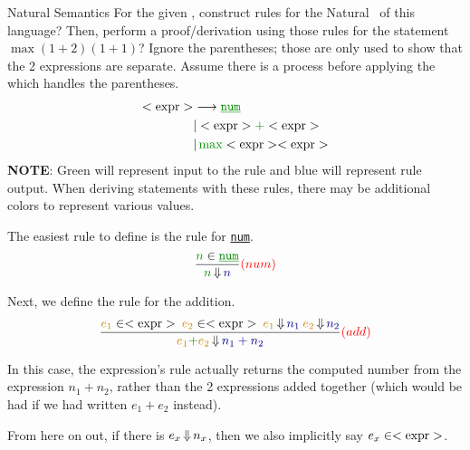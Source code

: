 \begin{example}[Lecture 3]{Natural Semantics}
  For the given , construct rules for the Natural~ of this language?
  Then, perform a proof/derivation using those rules for the statement $\max (1+2) (1+1)$?
  Ignore the parentheses; those are only used to show that the 2 expressions are separate.
  Assume there is a process before applying the  which handles the parentheses.
  \begin{align*}
    \Nonterminal{expr} &\longrightarrow \textcolor{Green4}{\underline{\mathtt{num}}} \\
                       &\vert \Nonterminal{expr} \textcolor{Green4}{+} \Nonterminal{expr} \\
                       &\vert \, \textcolor{Green4}{\mathtt{\max}} \Nonterminal{expr} \Nonterminal{expr}
  \end{align*}
  \tcblower{}
  \textbf{NOTE}: Green will represent input to the rule and blue will represent rule output.
  When deriving statements with these rules, there may be additional colors to represent various values.

  The easiest rule to define is the rule for \textcolor{Green4}{\underline{\texttt{num}}}.
  \begin{equation*}
    \frac{\textcolor{Green4}{n} \in \textcolor{Green4}{\underline{\mathtt{num}}}}{\textcolor{Green4}{n} \EvaluatesTo \textcolor{Blue4}{n}} \textcolor{red}{(num)}
  \end{equation*}

  Next, we define the rule for the addition.
  \begin{equation*}
    \frac{\textcolor{Orange3}{e_{1}} \in \Nonterminal{expr} \: \textcolor{Orange3}{e_{2}} \in \Nonterminal{expr} \: \textcolor{Orange3}{e_{1}} \EvaluatesTo \textcolor{Blue4}{n_{1}} \: \textcolor{Orange3}{e_{2}} \EvaluatesTo \textcolor{Blue4}{n_{2}}}{\textcolor{Orange3}{e_{1}} \textcolor{Green4}{\mathtt{+}} \textcolor{Orange3}{e_{2}} \EvaluatesTo \textcolor{Blue4}{n_{1} + n_{2}}} \textcolor{red}{(add)}
  \end{equation*}
  \begin{remark*}
    In this case, the expression's rule actually returns the computed number from the expression $n_{1} + n_{2}$, rather than the 2 expressions added together (which would be had if we had written $e_{1} + e_{2}$ instead).
  \end{remark*}

  \begin{remark*}
    From here on out, if there is $e_{x} \operatorname{\Downarrow} n_{x}$, then we also implicitly say $e_{x} \in <\text{expr}>$.
  \end{remark*}


\end{example}
